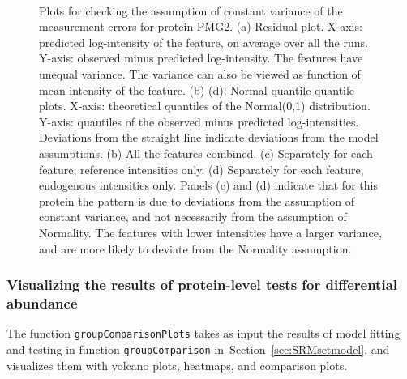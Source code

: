 \documentclass[11pt]{article}
\def\secref#1{Section~\ref{sec:#1}}
\begin{document}
\begin{figure}[t!]
\begin{center}
\begin{tabular}{ccc}
\end{tabular}\\
\vspace{-0.3cm}
\caption{\small Plots for checking the assumption of constant variance of the measurement errors for protein PMG2. (a) Residual plot. X-axis: predicted log-intensity of the feature, on average over all the runs. Y-axis: observed minus predicted log-intensity. The features have unequal variance. The variance can also be viewed as function of mean intensity of the feature. (b)-(d): Normal quantile-quantile plots. X-axis: theoretical quantiles of the Normal(0,1) distribution. Y-axis: quantiles of the observed minus predicted log-intensities. Deviations from the straight line indicate deviations from the model assumptions. (b) All the features combined. (c) Separately for each feature, reference intensities only. (d) Separately for each feature, endogenous intensities only. Panels (c) and (d) indicate that for this protein the pattern is due to deviations from the assumption of constant variance, and not necessarily from the assumption of Normality. The features with lower intensities have a larger variance, and are more likely to deviate from the Normality assumption.  \label{fig:SRMresiduals}}
\end{center}
\end{figure}

\clearpage
\subsubsection{Visualizing the results of protein-level tests for differential abundance \label{sec:SRMtestresult}}

The function {\tt groupComparisonPlots} takes as input the results of model fitting and testing in function {\tt groupComparison} in~\secref{SRMsetmodel}, and visualizes them with volcano plots, heatmaps, and comparison plots. 
\end{document}
